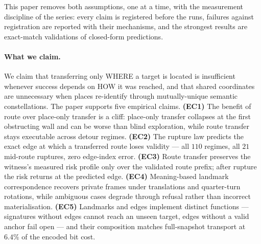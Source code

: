 \documentclass{article}
\begin{document}
This paper removes both assumptions, one at a time, with the
measurement discipline of the series: every claim is registered before
the runs, failures against registration are reported with their
mechanisms, and the strongest results are exact-match validations of
closed-form predictions.

\paragraph{What we claim.} We claim that transferring only WHERE a
target is located is insufficient whenever success depends on HOW it
was reached, and that shared coordinates are unnecessary when places
re-identify through mutually-unique semantic constellations. The
paper supports five empirical claims. \textbf{(EC1)} The benefit of
route over place-only transfer is a cliff: place-only transfer
collapses at the first obstructing wall and can be worse than blind
exploration, while route transfer stays executable across detour
regimes. \textbf{(EC2)} The rupture law predicts the exact edge at
which a transferred route loses validity --- all $110$ regimes, all
$21$ mid-route ruptures, zero edge-index error. \textbf{(EC3)} Route
transfer preserves the witness's measured risk profile only over the
validated route prefix; after rupture the risk returns at the
predicted edge. \textbf{(EC4)} Meaning-based landmark correspondence
recovers private frames under translations and quarter-turn
rotations, while ambiguous cases degrade through refusal rather than
incorrect materialisation. \textbf{(EC5)} Landmarks and edges
implement distinct functions --- signatures without edges cannot
reach an unseen target, edges without a valid anchor fail open ---
and their composition matches full-snapshot transport at $6.4\%$ of
the encoded bit cost.
\end{document}
